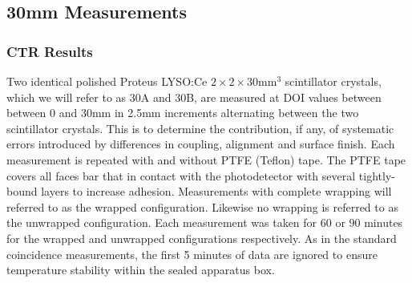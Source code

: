 \subsection{30mm Measurements}
\subsubsection{CTR Results}
Two identical polished Proteus LYSO:Ce $2\times2\times30$mm$^3$ scintillator crystals, which we will refer to as 30A and 30B, are measured at DOI values between between 0 and 30mm in 2.5mm increments alternating between the two scintillator crystals. This is to determine the contribution, if any, of systematic errors introduced by differences in coupling, alignment and surface finish. Each measurement is repeated with and without PTFE (Teflon) tape. The PTFE tape covers all faces bar that in contact with the photodetector with several tightly-bound layers to increase adhesion. Measurements with complete wrapping will referred to as the wrapped configuration. Likewise no wrapping is referred to as the unwrapped configuration. Each measurement was taken for 60 or 90 minutes for the wrapped and unwrapped configurations respectively. As in the standard coincidence measurements, the first 5 minutes of data are ignored to ensure temperature stability within the sealed apparatus box.

